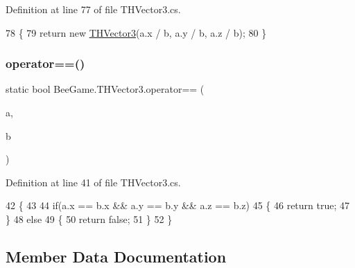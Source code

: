 Definition at line 77 of file T\+H\+Vector3.\+cs.


\begin{DoxyCode}
78         \{
79             \textcolor{keywordflow}{return} \textcolor{keyword}{new} \hyperlink{struct_bee_game_1_1_t_h_vector3_ad1b3467b019ea95fc114536aab566fb4}{THVector3}(a.x / b, a.y / b, a.z / b);
80         \}
\end{DoxyCode}
\mbox{\label{struct_bee_game_1_1_t_h_vector3_a34bd2c518136fe76411bba95f75cebdb}} 
\subsubsection{\texorpdfstring{operator==()}{operator==()}}
{\footnotesize\ttfamily static bool Bee\+Game.\+T\+H\+Vector3.\+operator== (\begin{DoxyParamCaption}\item[{\hyperlink{struct_bee_game_1_1_t_h_vector3}{T\+H\+Vector3}}]{a,  }\item[{\hyperlink{struct_bee_game_1_1_t_h_vector3}{T\+H\+Vector3}}]{b }\end{DoxyParamCaption})\hspace{0.3cm}{\ttfamily [static]}}



Definition at line 41 of file T\+H\+Vector3.\+cs.


\begin{DoxyCode}
42         \{
43 
44             \textcolor{keywordflow}{if}(a.x == b.x && a.y == b.y && a.z == b.z)
45             \{
46                 \textcolor{keywordflow}{return} \textcolor{keyword}{true};
47             \}
48             \textcolor{keywordflow}{else}
49             \{
50                 \textcolor{keywordflow}{return} \textcolor{keyword}{false};
51             \}
52         \}
\end{DoxyCode}


\subsection{Member Data Documentation}
\mbox{\label{struct_bee_game_1_1_t_h_vector3_a3a414a33eefb779cc52428463f428b6d}} 

